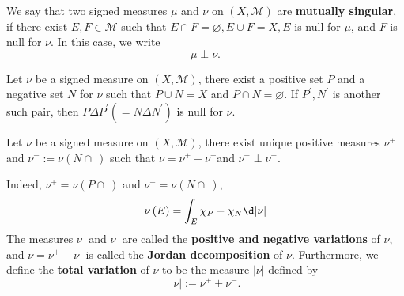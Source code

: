 \documentclass[12pt, a4paper, oneside]{book}
\begin{document}
\begin{definition}
    We say that two signed measures $\mu$ and $\nu$ on $(X, \mathcal{M})$ are \textbf{mutually singular}, if there exist $E, F \in \mathcal{M}$ such that $E \cap F=\varnothing, E \cup F=X, E$ is null for $\mu$, and $F$ is null for $\nu$. In this case, we write
    \begin{equation*}
        \mu \perp \nu .
    \end{equation*}
\end{definition}

\begin{theorem}
    Let $\nu$ be a signed measure on $(X, \mathcal{M})$, there exist a positive set $P$ and a negative set $N$ for $\nu$ such that $P \cup N=X$ and $P \cap N=\varnothing$. If $P^{\prime}, N^{\prime}$ is another such pair, then $P \Delta P^{\prime}\left(=N \Delta N^{\prime}\right)$ is null for $\nu$.
\end{theorem}




\begin{theorem}
    Let $\nu$ be a signed measure on $(X, \mathcal{M})$, there exist unique positive measures $\nu^{+}$ and $\nu^{-}:=\nu(N\cap \ )$ such that $\nu=\nu^{+}-\nu^{-}$and $\nu^{+} \perp \nu^{-}$.
    \begin{remark}
        Indeed, $\nu^+=\nu\left(P\cap \ \right)$ and $\nu^-=\nu\left(N\cap \ \right)$,
        \begin{equation*}
            \nu\left(E\right)
            =
            \int_E \chi_P-\chi_N \d |\nu|
        \end{equation*}
        The measures $\nu^{+}$and $\nu^{-}$are called the \textbf{positive and negative variations} of $\nu$, and $\nu=\nu^{+}-\nu^{-}$is called the \textbf{Jordan decomposition} of $\nu$. Furthermore, we define the \textbf{total variation} of $\nu$ to be the measure $|\nu|$ defined by
        \begin{equation*}
            \left|\nu\right|:=\nu^{+}+\nu^{-} .
        \end{equation*}
    \end{remark}
\end{theorem}
\end{document}
